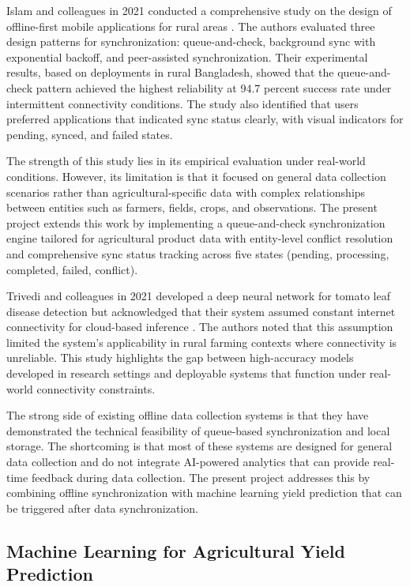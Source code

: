 Islam and colleagues in 2021 conducted a comprehensive study on the design of offline-first mobile applications for rural areas \cite{islam2021}. The authors evaluated three design patterns for synchronization: queue-and-check, background sync with exponential backoff, and peer-assisted synchronization. Their experimental results, based on deployments in rural Bangladesh, showed that the queue-and-check pattern achieved the highest reliability at 94.7 percent success rate under intermittent connectivity conditions. The study also identified that users preferred applications that indicated sync status clearly, with visual indicators for pending, synced, and failed states.

The strength of this study lies in its empirical evaluation under real-world conditions. However, its limitation is that it focused on general data collection scenarios rather than agricultural-specific data with complex relationships between entities such as farmers, fields, crops, and observations. The present project extends this work by implementing a queue-and-check synchronization engine tailored for agricultural product data with entity-level conflict resolution and comprehensive sync status tracking across five states (pending, processing, completed, failed, conflict).

Trivedi and colleagues in 2021 developed a deep neural network for tomato leaf disease detection but acknowledged that their system assumed constant internet connectivity for cloud-based inference \cite{trivedi2021}. The authors noted that this assumption limited the system's applicability in rural farming contexts where connectivity is unreliable. This study highlights the gap between high-accuracy models developed in research settings and deployable systems that function under real-world connectivity constraints.

The strong side of existing offline data collection systems is that they have demonstrated the technical feasibility of queue-based synchronization and local storage. The shortcoming is that most of these systems are designed for general data collection and do not integrate AI-powered analytics that can provide real-time feedback during data collection. The present project addresses this by combining offline synchronization with machine learning yield prediction that can be triggered after data synchronization.

\subsection{Machine Learning for Agricultural Yield Prediction}

